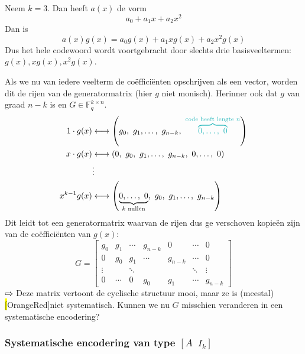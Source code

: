 \textbf{} Neem $k=3$. Dan heeft $a(x)$ de vorm
\begin{equation*}
    a_0 + a_1x + a_2x^2
\end{equation*}
Dan is
\begin{equation*}
    a(x)g(x) = a_0g(x) + a_1xg(x) + a_2x^2g(x)
\end{equation*}
Dus het hele codewoord wordt voortgebracht door slechts drie basisveeltermen: $g(x), xg(x), x^2g(x)$.

Als we nu van iedere veelterm de coëfficiënten opschrijven als een vector, worden dit de rijen van de generatormatrix (hier $g$ niet monisch). Herinner ook dat $g$ van graad $n-k$ is en $G \in \mathbb{F}_q^{k\times n}$.
\begin{equation*}
    \begin{aligned}
        1 \cdot g(x) &\longleftrightarrow \left( g_0,\ g_1,\dots,\ g_{n-k},\ \textcolor{Aquamarine}{\overbrace{0, \dots,\ 0}^{\text{code heeft lengte }n}} \right) \\
        x \cdot g(x) &\longleftrightarrow \left( 0,\ g_0,\ g_1, \dots,\ g_{n-k},\ 0, \dots,\ 0 \right) \\
        &\vdots \\
        x^{k-1}g(x) &\longleftrightarrow \left( \underbrace{0, \dots,\ 0}_{k \text{ nullen}},\ g_0,\ g_1, \dots,\ g_{n-k} \right)
    \end{aligned}
\end{equation*}
Dit leidt tot een generatormatrix waarvan de rijen dus ge verschoven kopieën zijn van de coëfficiënten van $g(x)$:
\begin{equation*}
    G = \begin{bmatrix}
        g_0 & g_1 & \cdots & g_{n-k} & 0 & \cdots & 0 \\
        0 & g_0 & g_1 & \cdots & g_{n-k} & \cdots & 0 \\
        \vdots & & \ddots & & & \ddots & \vdots \\
        0 & \cdots & 0 & g_0 & g_1 & \cdots & g_{n-k}
    \end{bmatrix}
\end{equation*}
$\rightwhitearrow$ Deze matrix vertoont de cyclische structuur mooi, maar ze is (meestal) \hl[OrangeRed]{niet systematisch}. Kunnen we nu $G$ misschien veranderen in een systematische encodering?

\subsubsection{Systematische encodering van type \texorpdfstring{$\left[A\;\;I_k\right]$}{[A Ik]}}

